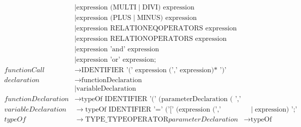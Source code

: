 \begin{align*}
                            & \mid \text{expression (MULTI} \mid \text{DIVI) expression}                                                        \\
                            & \mid \text{expression (PLUS} \mid \text{MINUS) expression}                                                        \\
                            & \mid \text{expression RELATIONEQOPERATORS expression}                                                             \\
                            & \mid \text{expression RELATIONOPERATORS expression}                                                               \\
                            & \mid \text{expression 'and' expression}                                                                           \\
                            & \mid \text{expression 'or' expression;}                                                                           \\
    functionCall            & \to \text{IDENTIFIER '(' expression (',' expression)* ')'}                                                        \\
    declaration             & \to \text{functionDeclaration}                                                                                    \\
                            & \mid \text{variableDeclaration}                                                                                   \\
    functionDeclaration     & \to \text{typeOf IDENTIFIER '(' (parameterDeclaration ( ',' parameterDeclaration)*)? ')' '\{' statements '\}'}    \\
    variableDeclaration     & \to \text{typeOf IDENTIFIER '=' ('[' (expression (',' expression)*)? ']'} \mid \text{expression) ';'}             \\
    typeOf                  & \to \text{TYPE\_TYPEOPERATOR}                                                                                  
    parameterDeclaration    & \to \text{typeOf IDENTIFIER}
\end{align*}

